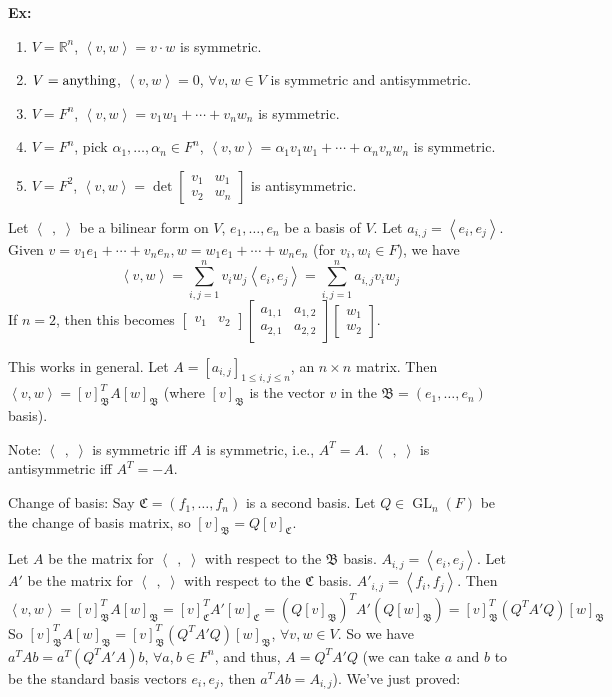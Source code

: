\documentclass[10pt,letterpaper]{article}
\newcommand{\n}{\hfill\break}
\newcommand{\up}{\vspace{-\baselineskip}}
\newcommand{\hangblock}[2]{\par\noindent\settowidth{\hangindent}{\textbf{#1: }}\textbf{#1: }\!\!\!#2}
\newcommand{\ex}[1]{\hangblock{Ex}{#1}}
\newcommand{\ptxt}[1]{\textrm{\textnormal{#1}}}
\newcommand{\reals}{\mathbb{R}}
\newcommand{\R}{\reals}
\newcommand{\tpose}{^{T}\!}
\newcommand{\iprod}[1]{\left<#1\right>}
\newcommand{\giprod}{\iprod{\;\,,\;}}
\DeclareMathOperator{\GL}{GL}
\newcommand{\smallBMatrix}[1]{\brack{\begin{smallmatrix}#1\end{smallmatrix}}}
\renewcommand{\brack}[1]{\left[#1\right]}
\begin{document}
\ex{
	\begin{enumerate}[topsep=0pt]
		\item $V=\R^{n}$, $\iprod{v,w}=v\cdot{}w$ is symmetric.
		\item $V=\ptxt{anything}$, $\iprod{v,w}=0$, $\forall{}v,w\in{}V$ is symmetric and antisymmetric.
		\item $V=F^{n}$, $\iprod{v,w}=v_{1}w_{1}+\cdots+v_{n}w_{n}$ is symmetric.
		\item $V=F^{n}$, pick $\alpha_{1},\ldots,\alpha_{n}\in{}F^{n}$, $\iprod{v,w}=\alpha_{1}v_{1}w_{1}+\cdots+\alpha_{n}v_{n}w_{n}$ is symmetric.
		\item $V=F^{2}$, $\iprod{v,w}=\det\smallBMatrix{v_{1} & w_{1}\\ v_{2} & w_{n}}$ is antisymmetric.
	\end{enumerate}\up\n
}

\par\noindent
Let $\giprod$ be a bilinear form on $V$, $e_{1},\ldots,e_{n}$ be a basis of $V$. Let $a_{i,j}=\iprod{e_{i},e_{j}}$.\n
Given $v=v_{1}e_{1}+\cdots+v_{n}e_{n},w=w_{1}e_{1}+\cdots+w_{n}e_{n}$ (for $v_{i},w_{i}\in{}F$), we have
\[
	\iprod{v,w}=\sum_{i,j=1}^{n}v_{i}w_{j}\iprod{e_{i},e_{j}}=\sum_{i,j=1}^{n}a_{i,j}v_{i}w_{j}
\]
If $n=2$, then this becomes $\smallBMatrix{v_{1} & v_{2}}\smallBMatrix{a_{1,1} & a_{1,2}\\ a_{2,1} & a_{2,2}}\smallBMatrix{w_{1}\\ w_{2}}$.\n

\par\noindent
This works in general. Let $A=[a_{i,j}]_{1\le{}i,j\le{}n}$, an $n\times{}n$ matrix. Then $\iprod{v,w}=[v]_{\mathfrak{B}}\tpose{}A[w]_{\mathfrak{B}}$ (where $[v]_{\mathfrak{B}}$ is the vector $v$ in the $\mathfrak{B}=(e_{1},\ldots,e_{n})$ basis).\n

\par\noindent
Note: $\giprod$ is symmetric iff $A$ is symmetric, i.e., $A\tpose=A$. $\giprod$ is antisymmetric iff $A\tpose=-A$.\n

\par\noindent
Change of basis: Say $\mathfrak{C}=(f_{1},\ldots,f_{n})$ is a second basis. Let $Q\in\GL_{n}(F)$ be the change of basis matrix, so $[v]_{\mathfrak{B}}=Q[v]_{\mathfrak{C}}$.\n

\par\noindent
Let $A$ be the matrix for $\giprod$ with respect to the $\mathfrak{B}$ basis. $A_{i,j}=\iprod{e_{i},e_{j}}$.\n
Let $A'$ be the matrix for $\giprod$ with respect to the $\mathfrak{C}$ basis. $A'_{i,j}=\iprod{f_{i},f_{j}}$.\n
Then
\[
	\iprod{v,w}=[v]_{\mathfrak{B}}\tpose{}A[w]_{\mathfrak{B}}=[v]_{\mathfrak{C}}\tpose{}A'[w]_{\mathfrak{C}}=(Q[v]_{\mathfrak{B}})\tpose{}A'(Q[w]_{\mathfrak{B}})=[v]_{\mathfrak{B}}\tpose(Q\tpose{}A'Q)[w]_{\mathfrak{B}}
\]
So $[v]_{\mathfrak{B}}\tpose{}A[w]_{\mathfrak{B}}=[v]_{\mathfrak{B}}\tpose(Q\tpose{}A'Q)[w]_{\mathfrak{B}}$, $\forall{}v,w\in{}V$. So we have $a\tpose{}Ab=a\tpose(Q\tpose{}A'A)b$, $\forall{}a,b\in{}F^{n}$, and thus, $A=Q\tpose{}A'Q$ (we can take $a$ and $b$ to be the standard basis vectors $e_{i},e_{j}$, then $a\tpose{}Ab=A_{i,j}$). We've just proved:\n
\end{document}

